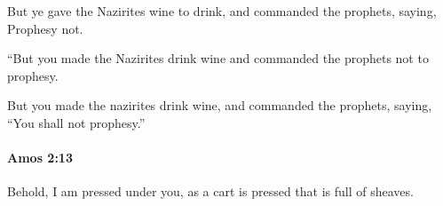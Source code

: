 			\begin{versebox}
					\item[BHS] 
					\item[LXX] 
					\item[ASV] But ye gave the Nazirites wine to drink, and commanded the prophets, saying, Prophesy not.
					\item[NIV] “But you made the Nazirites drink wine and commanded the prophets not to prophesy.
					\item[NRSV] But you made the nazirites drink wine, and commanded the prophets, saying, “You shall not prophesy.”
			\end{versebox}

		\paragraph{Amos 2:13} %
			\label{AMOS-2-13}

			Behold, I am pressed under you, as a cart is pressed that is full of sheaves.

